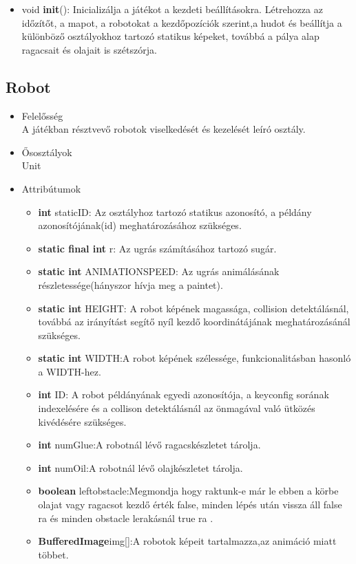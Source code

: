 \begin{itemize}
\begin{itemize}
	\item void \textbf{init}(): Inicializálja a játékot a kezdeti beállításokra. Létrehozza az időzítőt, a mapot, a robotokat a kezdőpozíciók szerint,a hudot és beállítja a különböző osztályokhoz tartozó statikus képeket, továbbá a pálya alap ragacsait és olajait is szétszórja.
	\end{itemize}
\end{itemize}

\subsection{Robot}
\begin{itemize}
\item Felelősség\\
A játékban résztvevő robotok viselkedését és kezelését leíró osztály.
\item Ősosztályok\\
Unit

\item Attribútumok
	\begin{itemize}
		\item \textbf{int} staticID: Az osztályhoz tartozó statikus azonosító, a példány                azonosítójának(id) meghatározásához szükséges.
			\item \textbf{static final int} r: Az ugrás számításához tartozó sugár. 
				\item \textbf{static int} ANIMATIONSPEED: Az ugrás animálásának részletessége(hányszor hívja meg a paintet). 
		\item \textbf{static int} HEIGHT: A robot képének magassága, collision                      detektálásnál, továbbá az irányítást segítő nyíl kezdő koordinátájának                  meghatározásánál szükséges.
		\item \textbf{static int} WIDTH:A robot képének szélessége, funkcionalitásban hasonló a WIDTH-hez.
		\item \textbf{int} ID: A robot példányának egyedi azonosítója, a keyconfig sorának                     indexelésére és a collison detektálásnál az önmagával való ütközés                      kivédésére szükséges.
		\item \textbf{int} numGlue:A robotnál lévő ragacskészletet tárolja.
		\item \textbf{int} numOil:A robotnál lévő olajkészletet tárolja.
		\item \textbf{boolean} leftobstacle:Megmondja hogy raktunk-e már le ebben a körbe olajat vagy ragacsot kezdő érték false, minden lépés után vissza áll false ra és minden obstacle lerakásnál true ra .
	\item \textbf{BufferedImage}img[]:A robotok képeit tartalmazza,az animáció miatt többet.
	

\end{itemize}
\end{itemize}
